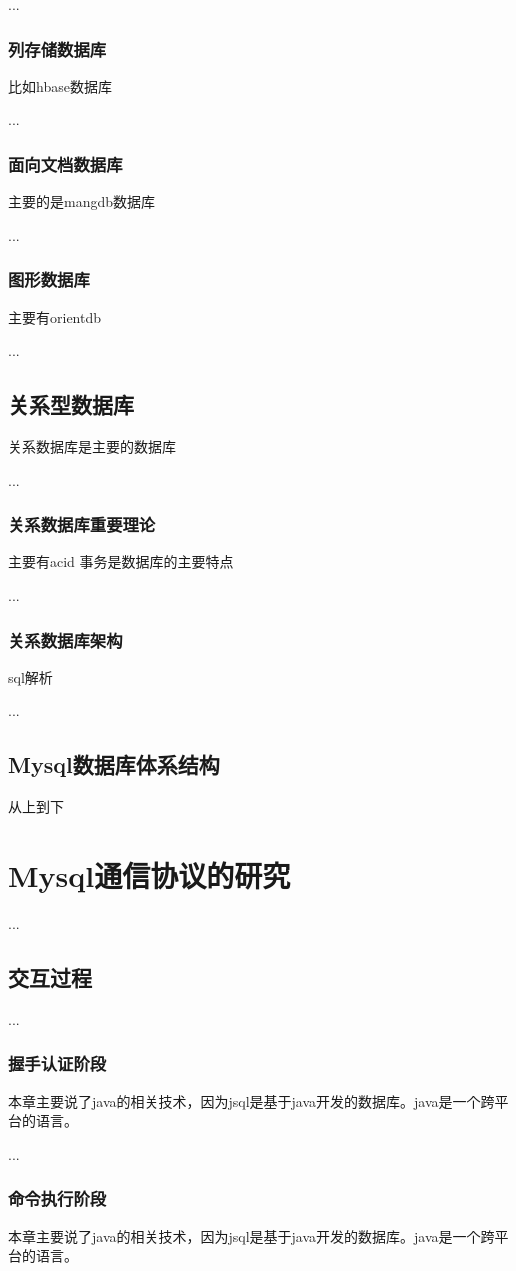 ...
\subsubsection*{列存储数据库}
比如hbase数据库

...
\subsubsection*{面向文档数据库}
主要的是mangdb数据库

...
\subsubsection*{图形数据库}
主要有orientdb

...
\subsection*{关系型数据库}
关系数据库是主要的数据库

...
\subsubsection*{关系数据库重要理论}
主要有acid
事务是数据库的主要特点

...
\subsubsection*{关系数据库架构}
sql解析

...
\subsection{Mysql数据库体系结构}
从上到下
\section{Mysql通信协议的研究}
...
\subsection{交互过程}
...
\subsubsection*{握手认证阶段}
本章主要说了java的相关技术，因为jsql是基于java开发的数据库。java是一个跨平台的语言。

...
\subsubsection*{命令执行阶段}
本章主要说了java的相关技术，因为jsql是基于java开发的数据库。java是一个跨平台的语言。

